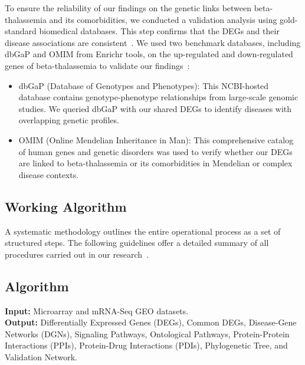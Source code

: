 To ensure the reliability of our findings on the genetic links between beta-thalassemia and its comorbidities, we conducted a validation analysis using gold-standard biomedical databases. This step confirms that the DEGs and their disease associations are consistent~\cite{val_ref1}. We used two benchmark databases, including dbGaP and OMIM from Enrichr tools, on the up-regulated and down-regulated genes of beta-thalassemia to validate our findings~\cite{val_ref1}:
\begin{itemize}
    \item dbGaP (Database of Genotypes and Phenotypes): This NCBI-hosted database contains genotype-phenotype relationships from large-scale genomic studies. We queried dbGaP with our shared DEGs to identify diseases with overlapping genetic profiles.
    \item OMIM (Online Mendelian Inheritance in Man): This comprehensive catalog of human genes and genetic disorders was used to verify whether our DEGs are linked to beta-thalassemia or its comorbidities in Mendelian or complex disease contexts.
\end{itemize}

\vspace*{-\parskip}
\subsection{Working Algorithm}
\label{sec:working_algorithm}

A systematic methodology outlines the entire operational process as a set of structured steps. The following guidelines offer a detailed summary of all procedures carried out in our research~\cite{algo_ref1}.

\vspace*{-\parskip}
\subsection{Algorithm}
\label{sec:algorithm}

\textbf{Input:} Microarray and mRNA-Seq GEO datasets. \\
\textbf{Output:} Differentially Expressed Genes (DEGs), Common DEGs, Disease-Gene Networks (DGNs), Signaling Pathways, Ontological Pathways, Protein-Protein Interactions (PPIs), Protein-Drug Interactions (PDIs), Phylogenetic Tree, and Validation Network.

